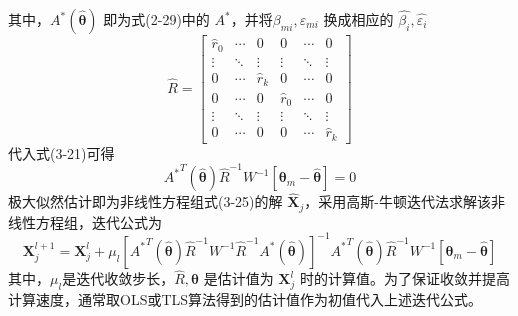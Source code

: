 其中，$A^*(\hat{\bm{\theta}})$ 即为式(2-29)中的 $A^*$，并将$\beta_{mi},\varepsilon_{mi}$ 换成相应的 $\hat{\beta_i},\hat{\varepsilon_i}$
\begin{equation}
	\hat{R} = \left[\begin{array}{ccc|ccc}
		\hat{r}_0 & \cdots & 0 & 0 & \cdots & 0\\
		\vdots & \ddots & \vdots & \vdots & \ddots & \vdots \\
		0 & \cdots & \hat{r}_k & 0 & \cdots & 0 \\ \hline
		0 & \cdots & 0 & \hat{r}_0 & \cdots & 0 \\
		\vdots & \ddots & \vdots & \vdots & \ddots & \vdots \\
		0 & \cdots & 0 & 0 & \cdots  & \hat{r}_k
	\end{array}\right]
\end{equation}
代入式(3-21)可得
\begin{equation}
	{A^*}^T(\hat{\bm{\theta}})\hat{R}^{-1}W^{-1}[\bm{\theta}_m - \hat{\bm{\theta}}] = 0
\end{equation}
极大似然估计即为非线性方程组式(3-25)的解 $\hat{\bm{X}}_j$，采用高斯-牛顿迭代法求解该非线性方程组，迭代公式为
\begin{equation}
	\bm{X}_j^{l+1} = \bm{X}_j^{l} + \mu_l[{A^*}^T(\hat{\bm{\theta}}) \hat{R}^{-1} W^{-1} \hat{R}^{-1} {A^*}(\hat{\bm{\theta}})]^{-1} {A^*}^T(\hat{\bm{\theta}}) \hat{R}^{-1} W^{-1} [\bm{\theta}_m - \hat{\bm{\theta}}]
\end{equation}
其中，$\mu_l$是迭代收敛步长，$\hat{R},\hat{\bm{\theta}}$ 是估计值为 $\bm{X}_j^{l}$ 时的计算值。为了保证收敛并提高计算速度，通常取OLS或TLS算法得到的估计值作为初值代入上述迭代公式。
